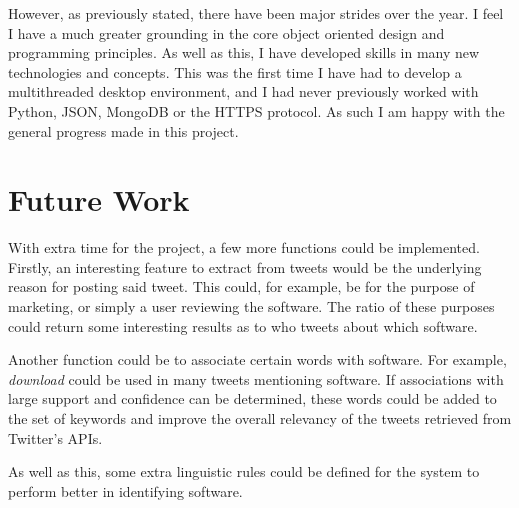 However, as previously stated, there have been major strides over the year. I feel I have a much greater grounding in the core object oriented design and programming principles. As well as this, I have developed skills in many new technologies and concepts. This was the first time I have had to develop a multithreaded desktop environment, and I had never previously worked with Python, JSON, MongoDB or the HTTPS protocol. As such I am happy with the general progress made in this project.

\section{Future Work}
With extra time for the project, a few more functions could be implemented. Firstly, an interesting feature to extract from tweets would be the underlying reason for posting said tweet. This could, for example, be for the purpose of marketing, or simply a user reviewing the software. The ratio of these purposes could return some interesting results as to who tweets about which software. 

Another function could be to associate certain words with software. For example, \emph{download} could be used in many tweets mentioning software. If associations with large support and confidence can be determined, these words could be added to the set of keywords and improve the overall relevancy of the tweets retrieved from Twitter's APIs.

As well as this, some extra linguistic rules could be defined for the system to perform better in identifying software.

